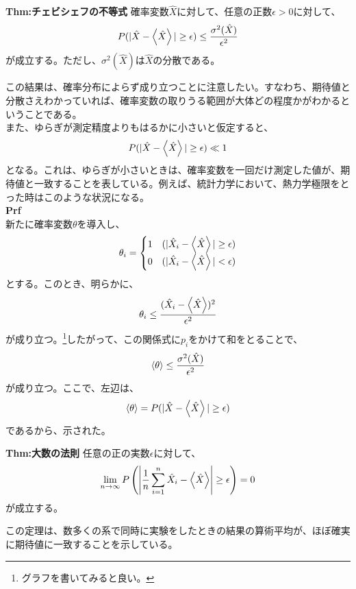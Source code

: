 \documentclass[a4paper,11pt]{jsarticle}
\numberwithin{equation}{section}
\begin{document}
\begin{itembox}[l]{\textbf{Thm:チェビシェフの不等式}}
  確率変数$\hat{X}$に対して、任意の正数$\epsilon > 0$に対して、
  \begin{align}
    P(|\hat{X} - \expval{\hat{X}}| \geq \epsilon) \leq \frac{\sigma^2(\hat{X})}{\epsilon^2}
  \end{align}
  が成立する。ただし、$\sigma^2(\hat{X})$は$\hat{X}$の分散である。

\end{itembox}
この結果は、確率分布によらず成り立つことに注意したい。すなわち、期待値と分散さえわかっていれば、確率変数の取りうる範囲が大体どの程度かがわかるということである。\\
また、ゆらぎが測定精度よりもはるかに小さいと仮定すると、
\begin{align}
  P(|\hat{X} - \expval{\hat{X}}| \geq \epsilon) \ll 1
\end{align}
となる。これは、ゆらぎが小さいときは、確率変数を一回だけ測定した値が、期待値と一致することを表している。例えば、統計力学において、熱力学極限をとった時はこのような状況になる。\\

\textbf{Prf}\\
新たに確率変数$\theta$を導入し、
\begin{align}
  \theta_i = \begin{cases}
    1 & (|\hat{X}_i - \expval{\hat{X}}| \geq \epsilon)\\
    0 & (|\hat{X}_i - \expval{\hat{X}}| < \epsilon)
  \end{cases}
\end{align}
とする。このとき、明らかに、
\begin{align}
  \theta_i \leq \frac{(\hat{X}_i - \expval{\hat{X}})^2}{\epsilon^2}
\end{align}
が成り立つ。\footnote{グラフを書いてみると良い。}したがって、この関係式に$p_i$をかけて和をとることで、
\begin{align}
  \ev{\theta} \leq \frac{\sigma^2(\hat{X})}{\epsilon^2}
\end{align}
が成り立つ。ここで、左辺は、
\begin{align}
  \ev{\theta} = P(|\hat{X} - \expval{\hat{X}}| \geq \epsilon)
\end{align}
であるから、示された。\hfill\qedsymbol\\

\begin{itembox}[l]{\textbf{Thm:大数の法則}}
  任意の正の実数$\epsilon$に対して、
  \begin{align}
    \lim_{n \to \infty} P\left(\left|\frac{1}{n} \sum_{i=1}^{n} \hat{X}_i - \expval{\hat{X}}\right| \geq \epsilon\right) = 0
  \end{align}
  が成立する。

\end{itembox}
この定理は、数多くの系で同時に実験をしたときの結果の算術平均が、ほぼ確実に期待値に一致することを示している。\\
\end{document}
